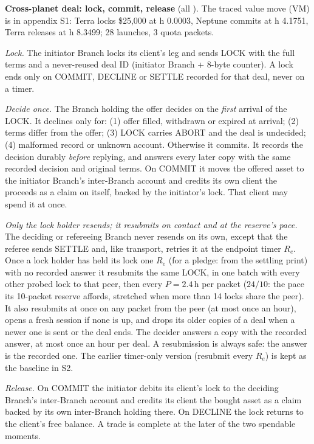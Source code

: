 \textbf{Cross-planet deal: lock, commit, release} (all \implemented). The traced value move (VM) is in appendix S1: Terra locks \$25{,}000 at h 0.0003, Neptune commits at h 4.1751, Terra releases at h 8.3499; 28 launches, 3 quota packets.
\begin{description}[leftmargin=2.2em,style=sameline]
\item[R6] \emph{Lock.} The initiator Branch locks its client's leg and sends LOCK with the full terms and a never-reused
deal ID (initiator Branch + 8-byte counter). A lock ends only on COMMIT, DECLINE or SETTLE recorded for that deal,
never on a timer.
\item[R7] \emph{Decide once.} The Branch holding the offer decides on the \emph{first} arrival of the LOCK. It declines
only for: (1) offer filled, withdrawn or expired at arrival; (2) terms differ from the offer; (3) LOCK carries ABORT
and the deal is undecided; (4) malformed record or unknown account. Otherwise it commits. It records the decision
durably \emph{before} replying, and answers every later copy with the same recorded decision and original terms.
On COMMIT it moves the offered asset to the initiator Branch's inter-Branch account and credits its own client the
proceeds as a claim on itself, backed by the initiator's lock. That client may spend it at once.
\item[R8] \emph{Only the lock holder resends; it resubmits on contact and at the reserve's pace.} The deciding or
refereeing Branch never resends on its own, except that the referee sends SETTLE and, like transport, retries it at
the endpoint timer $R_e$. Once a lock holder has held its lock one $R_e$ (for a pledge: from the settling print)
with no recorded answer it resubmits the same LOCK, in one batch with every other probed lock to that peer, then every
$P = 2.4$\,h per packet ($24/10$: the pace its 10-packet reserve affords, stretched when more than 14 locks share the
peer). It also resubmits at once on any packet from the peer (at most once an hour), opens a fresh session if none is
up, and drops its older copies of a deal when a newer one is sent or the deal ends. The decider answers a copy with
the recorded answer, at most once an hour per deal. A resubmission is always safe: the answer is the recorded one.
The earlier timer-only version (resubmit every $R_e$) is kept as the baseline in S2.
\item[R9] \emph{Release.} On COMMIT the initiator debits its client's lock to the deciding Branch's inter-Branch
account and credits its client the bought asset as a claim backed by its own inter-Branch holding there. On DECLINE
the lock returns to the client's free balance. A trade is complete at the later of the two spendable moments.
\end{description}

